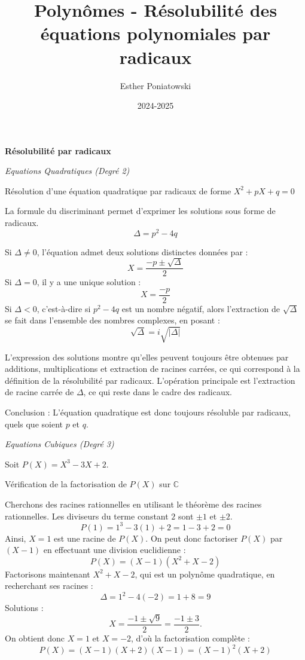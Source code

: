 \documentclass[10pt,a4paper]{article}
\title{Polynômes - Résolubilité des équations polynomiales par radicaux}
\author{Esther Poniatowski}
\date{2024-2025}
\begin{document}
\bigskip
\textbf{Résolubilité par radicaux}

\bigskip
\textit{Equations Quadratiques (Degré 2)}

\q Résolution d'une équation quadratique par radicaux de forme \( X^2 + pX + q = 0 \)

La formule du discriminant permet d'exprimer les solutions sous forme de radicaux.
\[
\Delta = p^2 - 4q
\]

Si \( \Delta \neq 0 \), l'équation admet deux solutions distinctes données par :
\[
X = \frac{-p \pm \sqrt{\Delta}}{2}
\]
Si \( \Delta = 0 \), il y a une unique solution :
\[
X = \frac{-p}{2}
\]
Si \( \Delta < 0 \), c'est-à-dire si \( p^2 - 4q \) est un nombre négatif, alors l'extraction de \(
\sqrt{\Delta} \) se fait dans l'ensemble des nombres complexes, en posant :
\[
\sqrt{\Delta} = i \sqrt{|\Delta|}
\]

L'expression des solutions montre qu'elles peuvent toujours être obtenues par additions,
multiplications et extraction de racines carrées, ce qui correspond à la définition de la
résolubilité par radicaux.
L'opération principale est l'extraction de racine carrée de \( \Delta \), ce qui reste dans le
cadre des radicaux.

Conclusion : L'équation quadratique est donc toujours résoluble par radicaux, quels que soient \( p
\) et \( q \).

\bigskip
\textit{Equations Cubiques (Degré 3)}

\q Soit \( P(X) = X^3 - 3X + 2 \).

Vérification de la factorisation de \( P(X) \) sur \( \mathbb{C} \)

Cherchons des racines rationnelles en utilisant le théorème des racines rationnelles. Les diviseurs
du terme constant \( 2 \) sont \( \pm 1 \) et \( \pm 2 \).
\[
P(1) = 1^3 - 3(1) + 2 = 1 - 3 + 2 = 0
\]
Ainsi, \( X = 1 \) est une racine de \( P(X) \). On peut donc factoriser \( P(X) \) par \( (X - 1)
\) en effectuant une division euclidienne :
\[
P(X) = (X - 1)(X^2 + X - 2)
\]
Factorisons maintenant \( X^2 + X - 2 \), qui est un polynôme quadratique, en recherchant ses
racines :
\[
\Delta = 1^2 - 4(-2) = 1 + 8 = 9
\]
Solutions :
\[
X = \frac{-1 \pm \sqrt{9}}{2} = \frac{-1 \pm 3}{2}.
\]
On obtient donc \( X = 1 \) et \( X = -2 \), d'où la factorisation complète :
\[
P(X) = (X - 1)(X + 2)(X - 1) = (X - 1)^2 (X + 2)
\]
\end{document}
